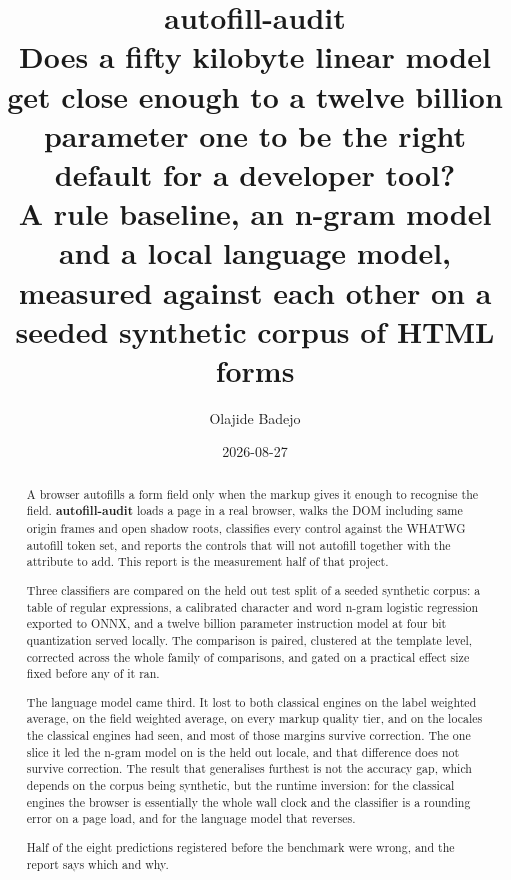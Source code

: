 \documentclass[11pt,a4paper,oneside]{report}
\title{%
  \Large\textbf{autofill-audit}\\[.6em]
  \large Does a fifty kilobyte linear model get close enough to a twelve
  billion parameter one to be the right default for a developer tool?\\[.4em]
  \normalsize A rule baseline, an n-gram model and a local language model,
  measured against each other on a seeded synthetic corpus of HTML forms
}
\author{Olajide Badejo}
\date{2026-08-27}
\begin{document}
\maketitle

\begin{abstract}
\noindent
A browser autofills a form field only when the markup gives it enough to
recognise the field. \textbf{autofill-audit} loads a page in a real browser,
walks the DOM including same origin frames and open shadow roots, classifies
every control against the WHATWG autofill token set, and reports the controls
that will not autofill together with the attribute to add. This report is the
measurement half of that project.

Three classifiers are compared on the held out test split of a seeded synthetic
corpus: a table of regular expressions, a calibrated character and word n-gram
logistic regression exported to ONNX, and a twelve billion parameter
instruction model at four bit quantization served locally. The comparison is
paired, clustered at the template level, corrected across the whole family of
comparisons, and gated on a practical effect size fixed before any of it ran.

The language model came third. It lost to both classical engines on the label
weighted average, on the field weighted average, on every markup quality tier,
and on the locales the classical engines had seen, and most of those margins
survive correction. The one slice it led the n-gram model on is the held out
locale, and that difference does not survive correction. The result that
generalises furthest is not the accuracy gap, which depends on the corpus being
synthetic, but the runtime inversion: for the classical engines the browser is
essentially the whole wall clock and the classifier is a rounding error on a
page load, and for the language model that reverses.

Half of the eight predictions registered before the benchmark were wrong, and
the report says which and why. \syntheticnote
\end{abstract}

\tableofcontents
\listoftables
\listoffigures














\appendix



\nocite{*}


\end{document}
